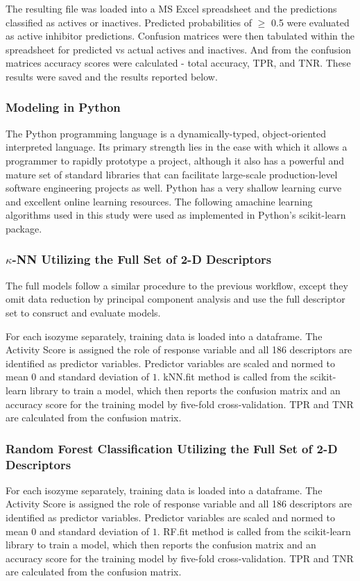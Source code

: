 The resulting file was loaded into a MS Excel spreadsheet and the predictions classified as actives or inactives. Predicted probabilities of $\geq$ 0.5 were evaluated as active inhibitor predictions. Confusion matrices were then tabulated within the spreadsheet for predicted vs actual actives and inactives. And from the confusion matrices accuracy scores were calculated - total accuracy, TPR, and TNR. These results were saved and the results reported below.

\subsubsection{Modeling in Python}
The Python programming language is a dynamically-typed, object-oriented interpreted language. Its primary strength lies in the ease with which it allows a programmer to rapidly prototype a project, although it also has a powerful and mature set of standard libraries that can facilitate large-scale production-level software engineering projects as well. Python has a very shallow learning curve and excellent online learning resources. The following amachine learning algorithms used in this study were used as implemented in Python's scikit-learn package.

\subsubsection{$\kappa$-NN Utilizing the Full Set of 2-D Descriptors}
The full models follow a similar procedure to the previous workflow, except they omit data reduction by principal component analysis and use the full descriptor set to consruct and evaluate models. 

For each isozyme separately, training data is loaded into a dataframe. The Activity Score is assigned the role of response variable and all 186 descriptors are identified as predictor variables. Predictor variables are scaled and normed to mean $0$ and standard deviation of $1$. kNN.fit method is called from the scikit-learn library to train a model, which then reports the confusion matrix and an accuracy score for the training model by five-fold cross-validation. TPR and TNR are calculated from the confusion matrix.

\subsubsection{Random Forest Classification Utilizing the Full Set of 2-D Descriptors}
For each isozyme separately, training data is loaded into a dataframe. The Activity Score is assigned the role of response variable and all 186 descriptors are identified as predictor variables. Predictor variables are scaled and normed to mean $0$ and standard deviation of $1$. RF.fit method is called from the scikit-learn library to train a model, which then reports the confusion matrix and an accuracy score for the training model by five-fold cross-validation. TPR and TNR are calculated from the confusion matrix.


